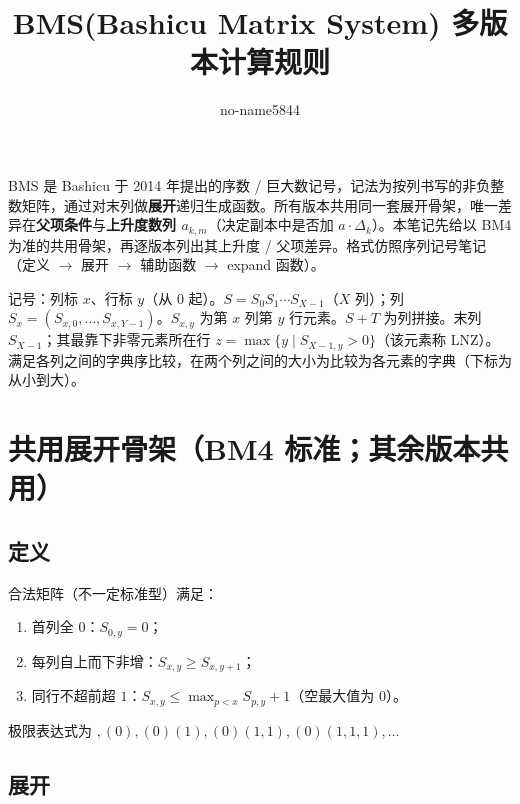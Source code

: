 \documentclass[UTF8]{ctexart}
\title{BMS(Bashicu Matrix System) 多版本计算规则}
\author{no-name5844}
\begin{document}
\maketitle

\setcounter{section}{-1}

BMS 是 Bashicu 于 2014 年提出的序数 / 巨大数记号，记法为按列书写的非负整数矩阵，通过对末列做\textbf{展开}递归生成函数。所有版本共用同一套展开骨架，唯一差异在\textbf{父项条件}与\textbf{上升度数列 $a_{k,m}$}（决定副本中是否加 $a\cdot\Delta_k$）。本笔记先给以 BM4 为准的共用骨架，再逐版本列出其上升度 / 父项差异。格式仿照序列记号笔记（定义 $\to$ 展开 $\to$ 辅助函数 $\to$ expand 函数）。

记号：列标 $x$、行标 $y$（从 $0$ 起）。$S=S_0S_1\cdots S_{X-1}$（$X$ 列）；列 $S_x=(S_{x,0},\dots,S_{x,Y-1})$。$S_{x,y}$ 为第 $x$ 列第 $y$ 行元素。$S+T$ 为列拼接。末列 $S_{X-1}$；其最靠下非零元素所在行 $z=\max\{y\mid S_{X-1,y}>0\}$（该元素称 LNZ）。
满足各列之间的字典序比较，在两个列之间的大小为比较为各元素的字典（下标为从小到大）。

\section{共用展开骨架（BM4 标准；其余版本共用）}
\subsection{定义}
合法矩阵（不一定标准型）满足：
\begin{enumerate}
  \item 首列全 $0$：$S_{0,y}=0$；
  \item 每列自上而下非增：$S_{x,y}\ge S_{x,y+1}$；
  \item 同行不超前超 $1$：$S_{x,y}\le\max_{p<x}S_{p,y}+1$（空最大值为 $0$）。
\end{enumerate}
极限表达式为 $,(0),(0)(1),(0)(1,1),(0)(1,1,1),\dots$

\subsection{展开}
\end{document}
